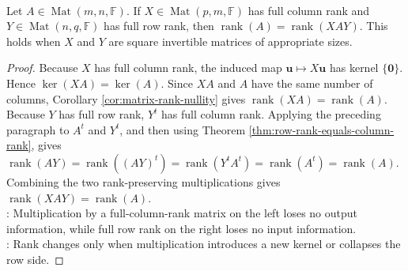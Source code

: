 \begin{theorem} \label{thm:full-rank-products-preserve-rank} \\
Let $A\in\operatorname{Mat}(m,n,\mathbb{F})$. If $X\in\operatorname{Mat}(p,m,\mathbb{F})$ has full column rank and $Y\in\operatorname{Mat}(n,q,\mathbb{F})$ has full row rank, then $\operatorname{rank}(A)=\operatorname{rank}(XAY)$. This holds when $X$ and $Y$ are square invertible matrices of appropriate sizes.
\begin{proof}
Because $X$ has full column rank, the induced map $\mathbf{u}\mapsto X\mathbf{u}$ has kernel $\{\mathbf{0}\}$. Hence $\ker(XA)=\ker(A)$. Since $XA$ and $A$ have the same number of columns, Corollary \ref{cor:matrix-rank-nullity} gives $\operatorname{rank}(XA)=\operatorname{rank}(A)$.\\
Because $Y$ has full row rank, $Y^t$ has full column rank. Applying the preceding paragraph to $A^t$ and $Y^t$, and then using Theorem \ref{thm:row-rank-equals-column-rank}, gives $\operatorname{rank}(AY)=\operatorname{rank}((AY)^t)=\operatorname{rank}(Y^tA^t)=\operatorname{rank}(A^t)=\operatorname{rank}(A)$.\\
Combining the two rank-preserving multiplications gives $\operatorname{rank}(XAY)=\operatorname{rank}(A)$.\\
: Multiplication by a full-column-rank matrix on the left loses no output information, while full row rank on the right loses no input information.\\
: Rank changes only when multiplication introduces a new kernel or collapses the row side.
\end{proof}
\end{theorem}

